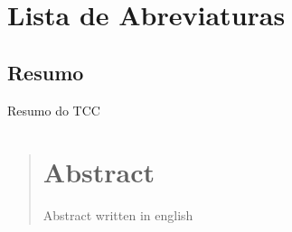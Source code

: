 \documentclass{ufpatcc}
\begin{document}

\listoffigures 
{} 
\clearpage

\listoftables 
{} 
\clearpage

\chapter*{Lista de Abreviaturas} \label{sec:siglas}
 \label{sec:siglas} 
\clearpage




\begin{ufpaResumo}
\chapter*{Resumo}
    Resumo do TCC

\end{ufpaResumo}

\begin{abstract}
\chapter*{Abstract}
    Abstract written in english

\end{abstract}




\end{document}
